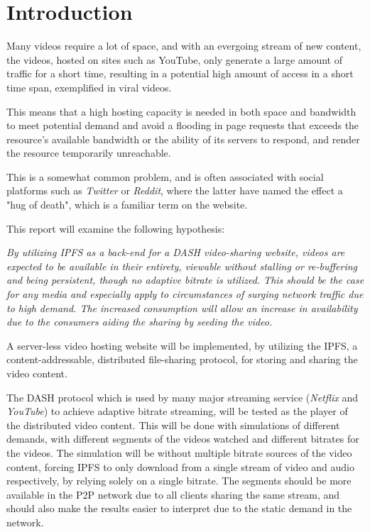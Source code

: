 \chapter{Introduction}
\label{cha:introduction}
Many videos require a lot of space, and with an evergoing stream of new content, the videos, hosted on sites such as YouTube, only generate a large amount of traffic for a short time, resulting in a potential high amount of access in a short time span, exemplified in viral videos. 

This means that a high hosting capacity is needed in both space and bandwidth to meet potential demand and avoid a flooding in page requests that exceeds the resource's available bandwidth or the ability of its servers to respond, and render the resource temporarily unreachable.

This is a somewhat common problem, and is often associated with social platforms such as \textit{Twitter} or \textit{Reddit}, where the latter have named the effect a "hug of death", which is a familiar term on the website.

\vspace{0.8cm}
\noindent This report will examine the following hypothesis:

\begin{displayquote}
    \textit{
        By utilizing \ac{IPFS} as a back-end for a \ac{DASH} video-sharing website, videos are expected to be available in their entirety, viewable without stalling or re-buffering and being persistent, though no adaptive bitrate is utilized.
        This should be the case for any media and especially apply to circumstances of surging network traffic due to high demand. The increased consumption will allow an increase in availability due to the consumers aiding the sharing by seeding the video.
    }
\end{displayquote}
\vspace{0.5cm}

A server-less video hosting website will be implemented, by utilizing the \ac{IPFS}, a content-addressable, distributed file-sharing protocol, for storing and sharing the video content.

The \ac{DASH} protocol which is used by many major streaming service (\eg \textit{Netflix} and \textit{YouTube}) to achieve adaptive bitrate streaming, will be tested as the player of the distributed video content. This will be done with simulations of different demands, with different segments of the videos watched and different bitrates for the videos. The simulation will be without multiple bitrate sources of the video content, forcing \ac{IPFS} to only download from a single stream of video and audio respectively, by relying solely on a single bitrate. The segments should be more available in the \ac{P2P} network due to all clients sharing the same stream, and should also make the results easier to interpret due to the static demand in the network.

